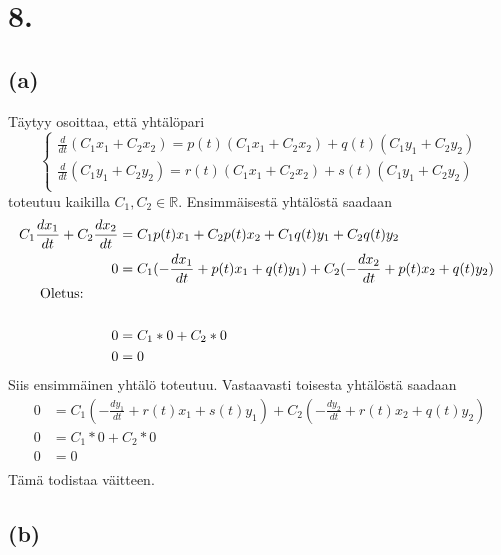 \documentclass{article}
\begin{document}
\section*{8.}

\subsection*{(a)}

Täytyy osoittaa, että yhtälöpari
\[
  \begin{cases}
    \frac{d}{dt}(C_1x_1 + C_2x_2) = p(t)(C_1x_1 + C_2x_2) + q(t)(C_1y_1 + C_2y_2) \\
    \frac{d}{dt}(C_1y_1 + C_2y_2) = r(t)(C_1x_1 + C_2x_2) + s(t)(C_1y_1 + C_2y_2) \\
  \end{cases}
\]
toteutuu kaikilla $C_1,C_2 \in \mathbb{R}$.
Ensimmäisestä yhtälöstä saadaan
\begin{align*}
  C_1\frac{dx_1}{dt} + C_2\frac{dx_2}{dt} &= C_1p(t)x_1 + C_2p(t)x_2 + C_1q(t)y_1 + C_2q(t)y_2 \\
  0 &= C_1(-\frac{dx_1}{dt} + p(t)x_1 + q(t)y_1) + C_2(-\frac{dx_2}{dt} + p(t)x_2 + q(t)y_2) \\
  \noalign{\text{Oletus:}} \\
  0 &= C_1 * 0 + C_2 * 0 \\
  0 &= 0 \\
\end{align*}
Siis ensimmäinen yhtälö toteutuu.
Vastaavasti toisesta yhtälöstä saadaan
\begin{align*}
  0 &= C_1(-\frac{dy_1}{dt} + r(t)x_1 + s(t)y_1) + C_2(-\frac{dy_2}{dt} + r(t)x_2 + q(t)y_2) \\
  0 &= C_1 * 0 + C_2 * 0 \\
  0 &= 0 \\
\end{align*}
Tämä todistaa väitteen.

\subsection*{(b)}
\end{document}
